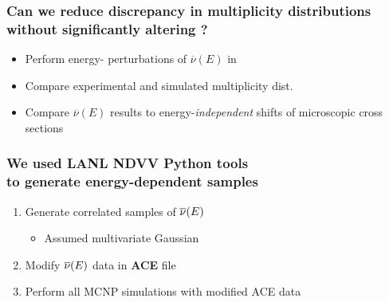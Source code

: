 \begin{frame}
\frametitle{Can we reduce discrepancy in multiplicity distributions \\ without significantly
altering \keff?}
{\addtolength\leftmargini{-0.2in}
 \addtolength\wideitemsep{0.1in}
\begin{itemize}
    \item[] Perform energy- perturbations of $\overline{\nu}(E)$  in
         \\ 
    \item[] Compare experimental and simulated multiplicity dist. 
            \\ 
        \item[] Compare $\overline{\nu}(E)$ results to energy-\emph{independent} shifts of
		microscopic cross sections 
	\end{itemize}	
}
\end{frame} 











\begin{frame}
\frametitle{We used LANL NDVV Python tools \\ to generate energy-dependent \nubar samples}
{\addtolength\wideitemsep{0.2in}
\begin{enumerate}
	\item Generate correlated samples of $\overline{\nu}(E)$ 
        \begin{itemize}\vspace{0.1in}
            \item {Assumed multivariate
                    Gaussian \\ }
    \end{itemize}
  \item Modify $\overline{\nu}(E)$ data in \textbf{ACE} file 
    \item Perform all MCNP simulations with modified ACE data
\end{enumerate} 
}
\end{frame} 




